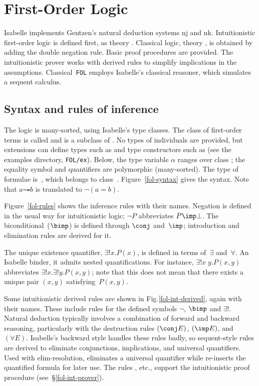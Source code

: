 \chapter{First-Order Logic}

Isabelle implements Gentzen's natural deduction systems {\sc nj} and {\sc
  nk}.  Intuitionistic first-order logic is defined first, as theory
.  Classical logic, theory , is
obtained by adding the double negation rule.  Basic proof procedures are
provided.  The intuitionistic prover works with derived rules to simplify
implications in the assumptions.  Classical~\texttt{FOL} employs Isabelle's
classical reasoner, which simulates a sequent calculus.

\section{Syntax and rules of inference}
The logic is many-sorted, using Isabelle's type classes.  The class of
first-order terms is called  and is a subclass of .
No types of individuals are provided, but extensions can define types such
as  and type constructors such as 
(see the examples directory, \texttt{FOL/ex}).  Below, the type variable
$\alpha$ ranges over class ; the equality symbol and quantifiers
are polymorphic (many-sorted).  The type of formulae is~, which
belongs to class~.  Figure~\ref{fol-syntax} gives the syntax.
Note that $a$\verb|~=|$b$ is translated to $\neg(a=b)$.

Figure~\ref{fol-rules} shows the inference rules with their names.
Negation is defined in the usual way for intuitionistic logic; $\neg P$
abbreviates $P\imp\bot$.  The biconditional~($\bimp$) is defined through
$\conj$ and~$\imp$; introduction and elimination rules are derived for it.

The unique existence quantifier, $\exists!x.P(x)$, is defined in terms
of~$\exists$ and~$\forall$.  An Isabelle binder, it admits nested
quantifications.  For instance, $\exists!x\;y.P(x,y)$ abbreviates
$\exists!x. \exists!y.P(x,y)$; note that this does not mean that there
exists a unique pair $(x,y)$ satisfying~$P(x,y)$.

Some intuitionistic derived rules are shown in
Fig.\ts\ref{fol-int-derived}, again with their names.  These include
rules for the defined symbols $\neg$, $\bimp$ and $\exists!$.  Natural
deduction typically involves a combination of forward and backward
reasoning, particularly with the destruction rules $(\conj E)$,
$({\imp}E)$, and~$(\forall E)$.  Isabelle's backward style handles these
rules badly, so sequent-style rules are derived to eliminate conjunctions,
implications, and universal quantifiers.  Used with elim-resolution,
 eliminates a universal quantifier while 
re-inserts the quantified formula for later use.  The rules
, etc., support the intuitionistic proof procedure
(see~\S\ref{fol-int-prover}).

